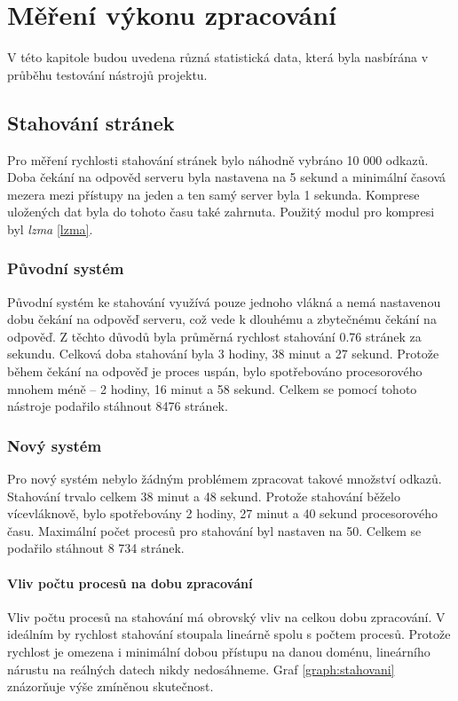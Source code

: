 \chapter{Měření výkonu zpracování}
V této kapitole budou uvedena různá statistická data, která byla nasbírána v průběhu
testování nástrojů projektu.

\section{Stahování stránek}
Pro měření rychlosti stahování stránek bylo náhodně vybráno 10 000 odkazů. Doba čekání
na odpověd serveru byla nastavena na 5 sekund a minimální časová mezera mezi přístupy
na jeden a ten samý server byla 1 sekunda. Komprese uložených dat byla do tohoto
času také zahrnuta. Použitý modul pro kompresi byl \textit{lzma} \ref{lzma}.

\subsection{Původní systém}
Původní systém ke stahování využívá pouze jednoho vlákná a nemá nastavenou dobu
čekání na odpověď serveru, což vede k dlouhému a zbytečnému čekání na odpověď.
Z těchto důvodů byla průměrná rychlost stahování 0.76 stránek za sekundu. Celková doba
stahování byla 3 hodiny, 38 minut a 27 sekund. Protože během čekání na odpověď je
proces uspán, bylo spotřebováno procesorového mnohem méně -- 2 hodiny, 16 minut a
58 sekund. Celkem se pomocí tohoto nástroje podařilo stáhnout 8476 stránek.

\subsection{Nový systém}
Pro nový systém nebylo žádným problémem zpracovat takové množství odkazů. Stahování
trvalo celkem 38 minut a 48 sekund. Protože stahování běželo vícevláknově, bylo
spotřebovány 2 hodiny, 27 minut a 40 sekund procesorového času. Maximální počet
procesů pro stahování byl nastaven na 50. Celkem se podařilo stáhnout 8 734 stránek.

\subsubsection{Vliv počtu procesů na dobu zpracování}
Vliv počtu procesů na stahování má obrovský vliv na celkou dobu zpracování. V
ideálním by rychlost stahování stoupala lineárně spolu s počtem procesů. Protože
rychlost je omezena i minimální dobou přístupu na danou doménu, lineárního nárustu
na reálných datech nikdy nedosáhneme. Graf \ref{graph:stahovani} znázorňuje výše
zmíněnou skutečnost.

